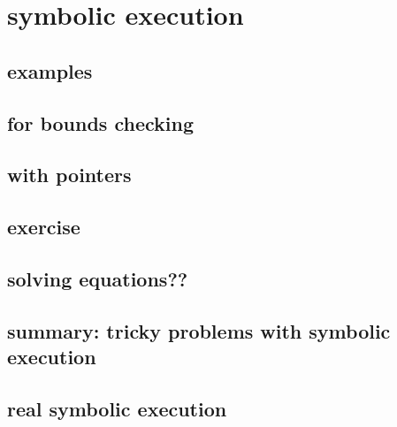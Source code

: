 \section{symbolic execution}



\subsection{examples}





        

\subsection{for bounds checking}


\subsection{with pointers}


\subsection{exercise}


\subsection{solving equations??}

\subsection{summary: tricky problems with symbolic execution}


\subsection{real symbolic execution}


